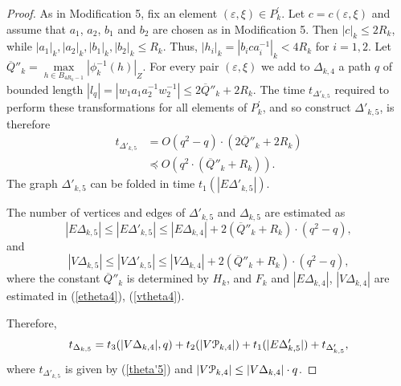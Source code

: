 \documentclass[a4paper,12pt]{article}
\newcommand{\G}{\Gamma }
\newcommand{\D}{\Delta }
\newcommand{\e}{\varepsilon }
\newcommand{\cP}{{\cal{P}}}
\numberwithin{equation}{section}
\numberwithin{figure}{section}
\begin{document}
\begin{proof}
As in Modification 5, fix an element $(\e,\xi)\in P_k^\prime$.
Let $c=c(\e,\xi)$ and assume that $a_1$, $a_2$, $b_1$
and $b_2$  are chosen as in Modification 5. Then $|c|_k\le 2R_k$,
while $|a_1|_k, |a_2|_k, |b_1|_k,|b_2|_k \le R_k$.
Thus, $|h_i|_k = |b_ica_i^{-1}|_k < 4R_k$ for
$i=1,2$. Let $\overline{Q}''_k=\max\limits_{h \in
B_{4R_k-1}}|\phi^{-1}_k(h)|_Z$. For every pair $(\e,\xi) $ we add
to $\D_{k,4}$ a path $q$ of bounded length $|l_q|= |w_1 a_1a_2^{-1}
w_2^{-1}| \le 2 \overline{Q}''_k +2 R_k$.
The time $t_{\D'_{k,5}}$ required to perform
these transformations for all elements of $P_k^\prime$, and
so construct $\D'_{k,5}$, is therefore
\begin{equation}\label{theta'5}
\begin{split}
t_{\D'_{k,5}} &= O(q^2-q)\cdot(2\overline{Q}''_k+2R_k)\\
&\preceq O(q^2 \cdot (\overline{Q}''_k+R_k)).
\end{split}
\end{equation}
The graph $\D'_{k,5}$ can be folded in time $t_1(|E\D'_{k,5}|)$.

The number of vertices and edges of $\D'_{k,5}$ and $\D_{k,5}$ are estimated as
\begin{equation}\label{etheta5}
|E\D_{k,5}| \le |E\D'_{k,5}| \le |E\D_{k,4}|+ 2(\overline{Q}''_k+
R_k)\cdot(q^2-q),
%
\end{equation}
and
\begin{equation}\label{vtheta5}
|V\D_{k,5}| \le |V \D'_{k,5}| \le |V
\D_{k,4}|+2(\overline{Q}''_k+R_k)\cdot(q^2-q),
\end{equation}
where the constant $\overline{Q}''_k$ is determined by $H_k$, and
$F_k$ and $|E \D_{k,4}|$, $|V \D_{k,4}|$ are estimated in (\ref{etheta4}),
(\ref{vtheta4}).


Therefore,
\begin{equation}\label{theta5}
t_{\D_{k,5}} = t_3(|V \D_{k,4}|, q) + t_2(|V\cP_{k,4}|)+ t_1(|E\D'_{k,5}|) +
t_{\D'_{k,5}},
\end{equation}
where $t_{\D'_{k,5}}$ is given by (\ref{theta'5}) and $|V\cP_{k,4}| \le |V
\D_{k,4}|\cdot q $.



\end{proof}
\end{document}
